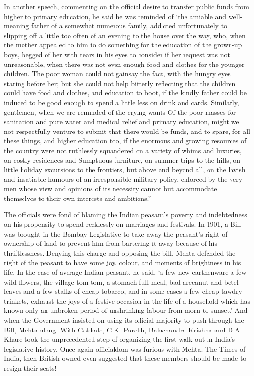 In another speech, commenting on the official desire to transfer public funds from higher to primary education, he said he was reminded of `the amiable and well-meaning father of a somewhat numerous family, addicted unfortunately to slipping off a little too often of an evening to the house over the way, who, when the mother appealed to him to do something for the education of the grown-up boys, begged of her with tears in his eyes to consider if her request was not unreasonable, when there was not even enough food and clothes for the younger children. The poor woman could not gainsay the fact, with the hungry eyes staring before her; but she could not help bitterly reflecting that the children could have food and clothes, and education to boot, if the kindly father could be induced to be good enough to spend a little less on drink and cards. Similarly, gentlemen, when we are reminded of the crying wants Of the poor masses for sanitation and pure water and medical relief and primary education, might we not respectfully venture to submit that there would be funds, and to spare, for all these things, and higher education too, if the enormous and growing resources of the country were not ruthlessly squandered on a variety of whims and luxuries, on costly residences and Sumptuous furniture, on summer trips to the hills, on little holiday excursions to the frontiers, but above and beyond all, on the lavish and insatiable humours of an irresponsible military policy, enforced by the very men whose view and opinions of its necessity cannot but accommodate themselves to their own interests and ambitions.''

The officials were fond of blaming the Indian peasant's poverty and indebtedness on his propensity to spend recklessly on marriages and festivals. In 1901, a Bill was brought in the Bombay Legislative to take away the peasant's right of ownership of land to prevent him from bartering it away because of his thriftlessness. Denying this charge and opposing the bill, Mehta defended the right of the peasant to have some joy, colour, and moments of brightness in his life. In the case of average Indian peasant, he said, `a few new earthenware a few wild flowers, the village tom-tom, a stomach-full meal, bad arecanut and betel leaves and a few stalks of cheap tobacco, and in some cases a few cheap tawdry trinkets, exhaust the joys of a festive occasion in the life of a household which has known only an unbroken period of unshrinking labour from morn to sunset.' And when the Government insisted on using its official majority to push through the Bill, Mehta along. With Gokhale, G.K. Parekh, Balachandra Krishna and D.A. Khare took the unprecedented step of organizing the first walk-out in India's legislative history. Once again officialdom was furious with Mehta. The Times of India, then British-owned even suggested that these members should be made to resign their seats!

